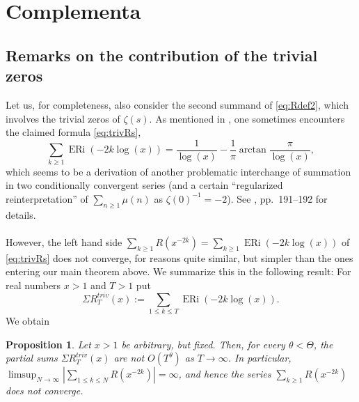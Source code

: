 \documentclass[a4paper,10pt]{amsart}
\DeclareMathOperator{\ERi}{ERi}
\newtheorem{proposition}[equation]{Proposition}
\theoremstyle{definition}
\numberwithin{equation}{section}
\begin{document}
\section{Complementa}\label{sect:41}
\subsection{Remarks on the contribution of the trivial zeros} 
Let us, for completeness, also consider the second summand of \eqref{eq:Rdef2}, which involves the trivial zeros of $\zeta(s)$. As mentioned in \cite{Elliott2025}, one sometimes encounters the claimed formula \eqref{eq:trivRs}, 
$$\sum_{k\geq 1} \ERi(-2k\log(x))=\frac{1}{\log(x)} - \frac{1}{\pi} \arctan{\frac{\pi}{\log(x)}},$$ 
which seems to be a derivation of another problematic interchange of summation in two conditionally convergent series (and a certain ``regularized reinterpretation'' of $\sum_{n\geq 1}\mu(n)$ as $\zeta(0)^{-1}=-2$). See \cite{Elliott2025}, pp.\ 191--192 for details.\\\\ 
However, the left hand side $\sum_{k\geq 1} R(x^{-2k})=\sum_{k\geq 1}\ERi(-2k\log(x))$ of \eqref{eq:trivRs} does not converge, for reasons quite similar, but simpler than the ones entering our main theorem above. We summarize this in the following result: For real numbers $x>1$ and $T>1$ put 
$$\Sigma R^{triv}_T(x):=\sum_{1\leq k\leq T}\ERi(-2k\log(x)).$$
We obtain

\begin{proposition}\label{prop:trivial-zeros}
Let $x>1$ be arbitrary, but fixed. Then, for every $\theta<\Theta$,  the partial sums $\Sigma R^{triv}_T(x)$ are not $O(T^\theta)$ as $T\to\infty$. In particular,
$\limsup_{N\to\infty}\left|\sum_{1\leq k\leq N} R(x^{-2k})\right|=\infty$, and hence the series $\sum_{k\geq1}R(x^{-2k})$ does not converge.
\end{proposition}
\end{document}
